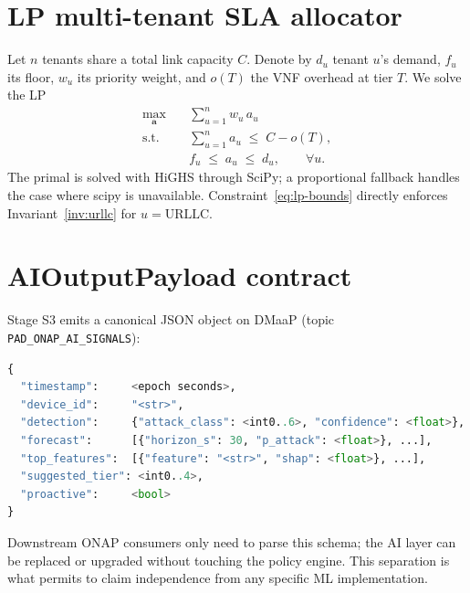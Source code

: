 \section{LP multi-tenant SLA allocator}
\label{sec:sla-lp}

Let $n$ tenants share a total link capacity $C$. Denote by $d_u$ tenant
$u$'s demand, $f_u$ its floor, $w_u$ its priority weight, and $o(T)$ the
VNF overhead at tier $T$. We solve the LP
\begin{align}
  \max_{\mathbf{a}} &\quad \sum_{u=1}^n w_u \, a_u \label{eq:lp-obj}\\
  \text{s.t.} &\quad \sum_{u=1}^n a_u \;\leq\; C - o(T), \label{eq:lp-cap}\\
  &\quad f_u \;\leq\; a_u \;\leq\; d_u, \qquad \forall u. \label{eq:lp-bounds}
\end{align}
The primal is solved with HiGHS through SciPy; a proportional fallback
handles the case where scipy is unavailable. Constraint~\eqref{eq:lp-bounds}
directly enforces Invariant~\ref{inv:urllc} for $u = \text{URLLC}$.

\section{AIOutputPayload contract}
\label{sec:payload}

Stage S3 emits a canonical JSON object on DMaaP (topic
\texttt{PAD\_ONAP\_AI\_SIGNALS}):

\begin{lstlisting}[language=Python,caption={Skeleton of AIOutputPayload.}]
{
  "timestamp":     <epoch seconds>,
  "device_id":     "<str>",
  "detection":     {"attack_class": <int0..6>, "confidence": <float>},
  "forecast":      [{"horizon_s": 30, "p_attack": <float>}, ...],
  "top_features":  [{"feature": "<str>", "shap": <float>}, ...],
  "suggested_tier": <int0..4>,
  "proactive":     <bool>
}
\end{lstlisting}

Downstream ONAP consumers only need to parse this schema; the AI layer
can be replaced or upgraded without touching the policy engine. This
separation is what permits \padonap{} to claim independence from any
specific ML implementation.
